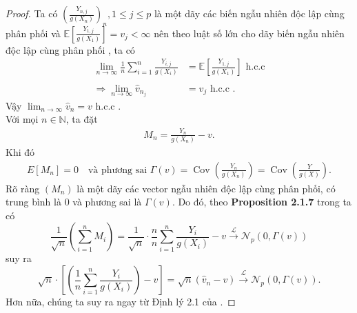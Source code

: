 \begin{proof}
Ta có 
$
\left(\frac{Y_{n, j}}{g\left(X_{n}\right)}\right)_n, 1\leq j \leq p
$
là một dãy các biến ngẫu nhiên độc lập cùng phân phối và 
$
\mathbb{E}\left[\frac{Y_{1, j}}{g\left(X_1\right)}\right] = v_j < \infty
$
nên theo luật số lớn cho dãy biến ngẫu nhiên độc lập cùng phân phối \cite{tien}, ta có
$$
\begin{aligned}
    \lim_{n\to\infty} \frac{1}{n} \sum_{i=1}^{n} \frac{Y_{i, j}}{g\left(X_{i}\right)} 
    &= \mathbb{E}\left[\frac{Y_{1, j}}{g\left(X_1\right)}\right] \text{    h.c.c}\\ \\
\Longrightarrow \lim_{n\to\infty} \widehat{v}_{n_j} &= v_j \text{    h.c.c .}
\end{aligned}
$$
Vậy $\lim_{n\to\infty} \widehat{v}_n = v \text{    h.c.c .}$\\
Với mọi $n\in \mathbb{N}$, ta đặt 
$$
\begin{aligned}
M_n=\frac{Y_n}{g\left(X_n\right)}-v.
\end{aligned}
$$
Khi đó 
$$
\begin{aligned}
E\left[M_n\right]=0 \quad \text {và phương sai } \Gamma(v)=\operatorname{Cov}\left(\frac{Y_n}{g(X_n)}\right)=\operatorname{Cov}\left(\frac{Y}{g(X)}\right).
\end{aligned}
$$
Rõ ràng $\left(M_n\right)$ là một dãy các vector ngẫu nhiên độc lập cùng phân phối, có trung bình là $0$ và phương sai là $\Gamma(v)$. Do đó, theo \textbf{Proposition 2.1.7} trong \cite{duflo} ta có 
$$
\frac{1}{\sqrt{n}}\left(\sum_{i=1}^{n}M_i\right)=\frac{1}{\sqrt{n}}\cdot \frac{n}{n} \sum_{i=1}^{n} \frac{Y_{i}}{g\left(X_i\right)}- v \stackrel{\mathcal{L}}{\longrightarrow} \mathcal{N}_{p}(0, \Gamma(v))
$$
suy ra 
$$
\sqrt{n} \cdot \left[\left(\frac{1}{n} \sum_{i=1}^{n} \frac{Y_{i}}{g\left(X_i\right)}\right)- v \right]= \sqrt{n}\left(\widehat{v}_{n}-v\right)\stackrel{\mathcal{L}}{\longrightarrow} \mathcal{N}_{p}(0, \Gamma(v)).
$$
Hơn nữa, chúng ta suy ra ngay  từ Định lý 2.1 của \cite{chaabane}.
\end{proof}

